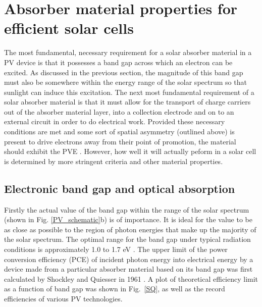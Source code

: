 \documentclass[11pt, twoside]{report}
\begin{document}
\section{Absorber material properties for efficient solar cells}\label{PV_properties}
The most fundamental, necessary requirement for a solar absorber material in a PV device is that it possesses a band gap across which an electron can be excited. As discussed in the previous section, the magnitude of this band gap must also be somewhere within the energy range of the solar spectrum so that sunlight can induce this excitation. The next most fundamental requirement of a solar absorber material is that it must allow for the transport of charge carriers out of the absorber material layer, into a collection electrode and on to an external circuit in order to do electrical work. Provided these necessary conditions are met and some sort of spatial asymmetry (outlined above) is present to drive electrons away from their point of promotion, the material should exhibit the PVE \cite{Nelson2}. However, how well it will actually peform in a solar cell is determined by more stringent criteria and other material properties. 

\subsection{Electronic band gap and optical absorption}

Firstly the actual value of the band gap within the range of the solar spectrum (shown in Fig. \ref{PV_schematic}b) is of importance. It is ideal for the value to be as close as possible to the region of photon energies that make up the majority of the solar spectrum. The optimal range for the band gap under typical radiation conditions is approximately 1.0 to 1.7 eV \cite{PV_E_range}. The upper limit of the power conversion efficiency (PCE) of incident photon energy into electrical energy by a device made from a particular absorber material based on its band gap was first calculated by Shockley and Quiesser in 1961 \cite{SQ_1961}. A plot of theoretical efficiency limit as a function of band gap was shown in Fig.~\ref{SQ}, as well as the record efficiencies of various PV technologies.
\end{document}
